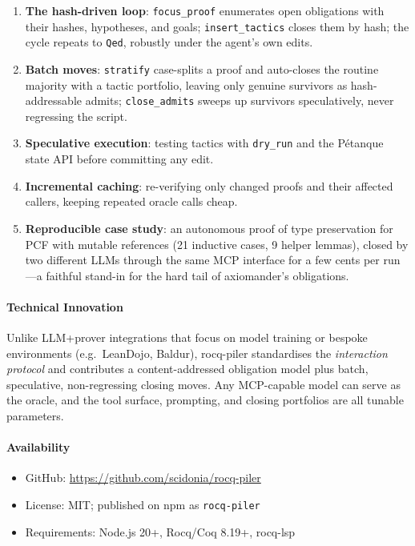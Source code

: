 \documentclass[sigconf,screen]{acmart}
\begin{document}
\begin{enumerate}
\item \textbf{The hash-driven loop}: \texttt{focus\_proof} enumerates open
obligations with their hashes, hypotheses, and goals; \texttt{insert\_tactics}
closes them by hash; the cycle repeats to \texttt{Qed}, robustly under the
agent's own edits.

\item \textbf{Batch moves}: \texttt{stratify} case-splits a proof and
auto-closes the routine majority with a tactic portfolio, leaving only genuine
survivors as hash-addressable admits; \texttt{close\_admits} sweeps up survivors
speculatively, never regressing the script.

\item \textbf{Speculative execution}: testing tactics with \texttt{dry\_run} and
the Pétanque state API before committing any edit.

\item \textbf{Incremental caching}: re-verifying only changed proofs and their
affected callers, keeping repeated oracle calls cheap.

\item \textbf{Reproducible case study}: an autonomous proof of type preservation
for PCF with mutable references (21 inductive cases, 9 helper lemmas), closed by
two different LLMs through the same MCP interface for a few cents per run---a
faithful stand-in for the hard tail of axiomander's obligations.
\end{enumerate}

\paragraph{Technical Innovation}

Unlike LLM+prover integrations that focus on model training or bespoke
environments (e.g.\ LeanDojo, Baldur), rocq-piler standardises the
\emph{interaction protocol} and contributes a content-addressed obligation model
plus batch, speculative, non-regressing closing moves. Any MCP-capable model can
serve as the oracle, and the tool surface, prompting, and closing portfolios are
all tunable parameters.

\paragraph{Availability}

\begin{itemize}
\item GitHub: \url{https://github.com/scidonia/rocq-piler}
\item License: MIT; published on npm as \texttt{rocq-piler}
\item Requirements: Node.js 20+, Rocq/Coq 8.19+, rocq-lsp
\end{itemize}
\end{document}
